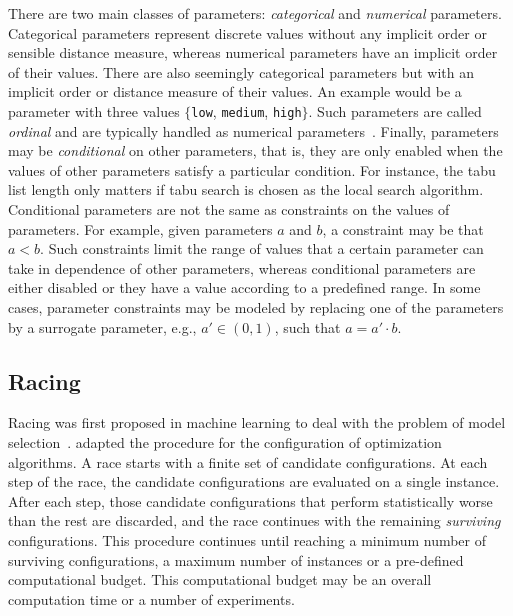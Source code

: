 \documentclass[a4paper]{article}
\newcommand{\eg}{e.g.}%
\begin{document}
There are two main classes of  parameters:
\emph{categorical} and \emph{numerical} parameters. Categorical
parameters represent discrete values without any implicit order or
sensible distance measure, whereas numerical parameters have an
implicit order of their values. There are also seemingly categorical
parameters but with an implicit order or distance measure of their
values. An example would be a parameter with three values
$\{$\texttt{low}, \texttt{medium}, \texttt{high}$\}$. Such parameters
are called \emph{ordinal} and are typically handled as numerical
parameters~\citep{BirYuaBal2010:emaoa}. Finally, parameters may be
\emph{conditional} on other parameters, that is, they are only enabled
when the values of other parameters satisfy a particular
condition. For instance, the tabu list length only matters if tabu search is chosen as the local search algorithm. Conditional parameters are not the same as
constraints on the values of parameters.  For example, given
parameters $a$ and $b$, a constraint may be that $a < b$. Such
constraints limit the range of values that a certain parameter can
take in dependence of other parameters, whereas conditional parameters
are either disabled or they have a value according to a predefined
range. In some cases, parameter constraints may be modeled by
replacing one of the parameters by a surrogate parameter, \eg{}, $a'
\in (0,1)$, such that $ a = a' \cdot b$.





\subsection{Racing}

Racing was first proposed in machine learning to deal with the problem
of model selection~\cite{MarMoo1997air}. 
\citet{Birattari09tuning} adapted the procedure for the configuration
of optimization algorithms. A race starts with a finite set of
candidate configurations. At each step of the race, the candidate
configurations are evaluated on a single instance. After each step,
those candidate configurations that perform statistically worse than
the rest are discarded, and the race continues with the remaining
\emph{surviving} configurations. This procedure continues until
reaching a minimum number of surviving configurations, a maximum
number of instances or a pre-defined computational budget. This
computational budget may be an overall computation time or a number of
experiments.
\end{document}
